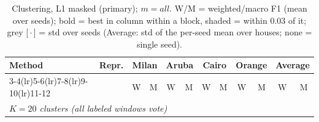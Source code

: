 \begin{table}[H]
\centering\small
\caption{Clustering, L1 masked (primary); $m=all$. W/M = weighted/macro F1 (mean over seeds); bold = best in column within a block, shaded = within 0.03 of it; grey [\,$\cdot$\,] = std over seeds (Average: std of the per-seed mean over houses; none = single seed).}
\label{tab:clu_l1_masked_mall}
\setlength{\tabcolsep}{3.2pt}
\begin{tabular}{llcc|cc|cc|cc|cc}
\toprule
Method & Repr. & \multicolumn{2}{c}{Milan} & \multicolumn{2}{c}{Aruba} & \multicolumn{2}{c}{Cairo} & \multicolumn{2}{c}{Orange} & \multicolumn{2}{c}{Average} \\
\cmidrule(lr){3-4}\cmidrule(lr){5-6}\cmidrule(lr){7-8}\cmidrule(lr){9-10}\cmidrule(lr){11-12}
 & & W & M & W & M & W & M & W & M & W & M \\
\midrule
\multicolumn{12}{l}{\textit{$K = 20$ clusters (all labeled windows vote)}} \\
\midrule

\end{tabular}
\end{table}
